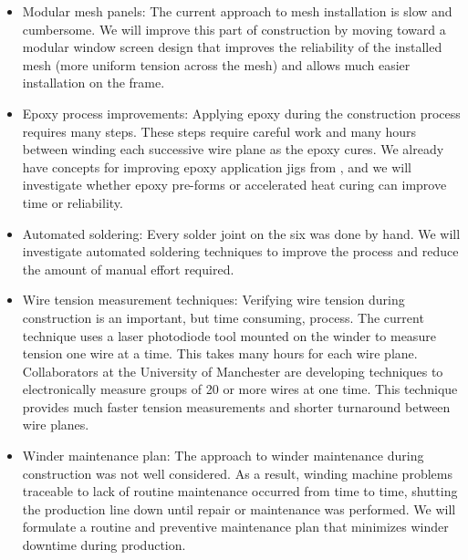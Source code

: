 \begin{itemize}
\begin{dunefigure}{fig:winding-dev}
{Work is ongoing to modify the wiring machine design to allow an  frame to be rotated without removing it from the frame.  This would reduce the required handling of the frame during fabrication and speed production substantially.}
\texttt{[image: sp-apa-winding-machine-design-development.jpg]} 
\end{dunefigure}

\item Modular mesh panels: The current approach to mesh installation is slow and cumbersome. We will improve this part of construction by moving toward a modular window screen design that improves the reliability of the installed mesh (more uniform tension across the mesh) and allows much easier installation on the  frame.


\item Epoxy process improvements: Applying epoxy during the construction process requires many steps. These steps require careful work and many hours between winding each successive wire plane as the epoxy cures. We already have concepts for improving epoxy application jigs from , and we will investigate whether epoxy pre-forms or accelerated heat curing can improve time or reliability.

\item Automated soldering: Every solder joint on the six   was done by hand. We will investigate automated soldering techniques to improve the process and reduce the amount of manual effort required. 

\item Wire tension measurement techniques: Verifying wire tension during construction is an important, but time consuming, process. The current technique uses a laser photodiode tool mounted on the winder to measure tension one wire at a time. This takes many hours for each wire plane. Collaborators at the University of Manchester are developing techniques to electronically measure groups of \num{20} or more wires at one time. This technique provides much faster tension measurements and shorter turnaround between wire planes. 

\item Winder maintenance plan: The approach to winder maintenance during  construction was not well considered. As a result, winding machine problems traceable to lack of routine maintenance occurred from time to time, shutting the production line down until repair or maintenance was performed. We will formulate a routine and preventive maintenance plan that minimizes winder downtime during  production.
\end{itemize}


